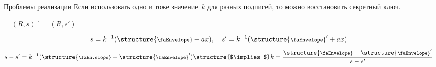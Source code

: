 \documentclass{beamer}
\begin{document}
	\begin{frame}{Проблемы реализации}
		Если использовать одно и тоже значение~$k$ для разных подписей, то можно восстановить секретный ключ.
\begin{center}
\structure{\faPaw} = $(R, s)$ \quad
\structure{\faPaw}' = $(R, s')$
\end{center}
\[
s = k^{-1} (\text{\structure{\footnotesize\faEnvelope}} + a x),\quad
s' = k^{-1} (\text{\structure{\footnotesize\faEnvelope}}' + a x)
\]
\[
s-s' = k^{-1} (\text{\structure{\footnotesize\faEnvelope}}-\text{\structure{\footnotesize\faEnvelope}}') \text{\structure{$\implies$}} k = \frac{\text{\structure{\footnotesize\faEnvelope}}-\text{\structure{\footnotesize\faEnvelope}}'}{s-s'}
\]
\begin{center}
\end{center}
\end{frame}
\end{document}
